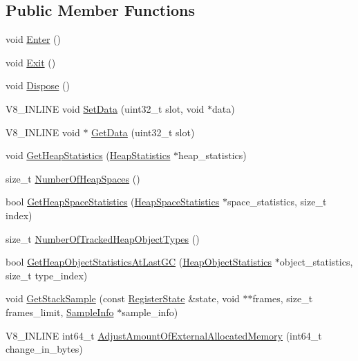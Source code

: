\subsection*{Public Member Functions}
\begin{DoxyCompactItemize}
\item 
void \hyperlink{classv8_1_1Isolate_aec80bb49b6b7647ff75e8f2cc9484ea3}{Enter} ()
\item 
void \hyperlink{classv8_1_1Isolate_a64a8503cafd00d1d2cadfbb0c2345054}{Exit} ()
\item 
void \hyperlink{classv8_1_1Isolate_a1a5a5762e4221aff8c6b10f9e3cec0af}{Dispose} ()
\item 
V8\+\_\+\+I\+N\+L\+I\+N\+E void \hyperlink{classv8_1_1Isolate_a2ae968a7ff8a397f1ac09d32990883f6}{Set\+Data} (uint32\+\_\+t slot, void $\ast$data)
\item 
V8\+\_\+\+I\+N\+L\+I\+N\+E void $\ast$ \hyperlink{classv8_1_1Isolate_aed85b3c82bf69a60ecebc2558ab95083}{Get\+Data} (uint32\+\_\+t slot)
\item 
void \hyperlink{classv8_1_1Isolate_add32e78544edaf8946ed9b328167e5e4}{Get\+Heap\+Statistics} (\hyperlink{classv8_1_1HeapStatistics}{Heap\+Statistics} $\ast$heap\+\_\+statistics)
\item 
size\+\_\+t \hyperlink{classv8_1_1Isolate_ad948acf0892e677a95fbc743b63ca5fa}{Number\+Of\+Heap\+Spaces} ()
\item 
bool \hyperlink{classv8_1_1Isolate_a28ab96294ee07064cbba01e969b62cbc}{Get\+Heap\+Space\+Statistics} (\hyperlink{classv8_1_1HeapSpaceStatistics}{Heap\+Space\+Statistics} $\ast$space\+\_\+statistics, size\+\_\+t index)
\item 
size\+\_\+t \hyperlink{classv8_1_1Isolate_a170044cddf655345682cb3c9b4bd1788}{Number\+Of\+Tracked\+Heap\+Object\+Types} ()
\item 
bool \hyperlink{classv8_1_1Isolate_a677681d4c3abfc1bc2e8b50c23623e24}{Get\+Heap\+Object\+Statistics\+At\+Last\+G\+C} (\hyperlink{classv8_1_1HeapObjectStatistics}{Heap\+Object\+Statistics} $\ast$object\+\_\+statistics, size\+\_\+t type\+\_\+index)
\item 
void \hyperlink{classv8_1_1Isolate_a8b173b48a477267ccd6c7d17c492b82e}{Get\+Stack\+Sample} (const \hyperlink{structv8_1_1RegisterState}{Register\+State} \&state, void $\ast$$\ast$frames, size\+\_\+t frames\+\_\+limit, \hyperlink{structv8_1_1SampleInfo}{Sample\+Info} $\ast$sample\+\_\+info)
\item 
V8\+\_\+\+I\+N\+L\+I\+N\+E int64\+\_\+t \hyperlink{classv8_1_1Isolate_aaeda5fa60961a3d9d476c46200e30711}{Adjust\+Amount\+Of\+External\+Allocated\+Memory} (int64\+\_\+t change\+\_\+in\+\_\+bytes)
$$
\end{DoxyCompactItemize}
